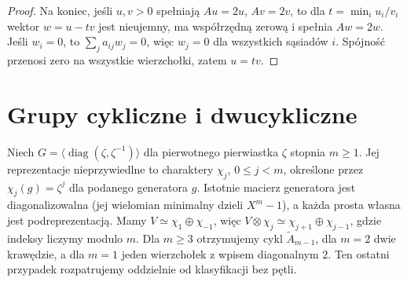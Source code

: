 \begin{proof}
Na koniec, jeśli $u,v>0$ spełniają $Au=2u$, $Av=2v$,
to dla $t=\min_i u_i/v_i$ wektor $w=u-tv$ jest
nieujemny, ma współrzędną zerową i spełnia $Aw=2w$.
Jeśli $w_i=0$, to $\sum_j a_{ij}w_j=0$, więc
$w_j=0$ dla wszystkich sąsiadów $i$. Spójność
przenosi zero na wszystkie wierzchołki, zatem $u=tv$.
\end{proof}

\section{Grupy cykliczne i dwucykliczne}

\begin{przyklad}
\label{aa:prz:mckay-cyclic}
Niech $G=\langle\operatorname{diag}(\zeta,\zeta^{-1})\rangle$
dla pierwotnego pierwiastka $\zeta$ stopnia $m\ge1$.
Jej reprezentacje nieprzywiedlne to charaktery $\chi_j$,
$0\le j<m$, określone przez $\chi_j(g)=\zeta^j$ dla
podanego generatora $g$. Istotnie macierz generatora
jest diagonalizowalna (jej wielomian minimalny dzieli
$X^m-1$), a każda prosta własna jest podreprezentacją.
Mamy $V\simeq\chi_1\oplus\chi_{-1}$, więc
$V\otimes\chi_j\simeq\chi_{j+1}\oplus\chi_{j-1}$,
gdzie indeksy liczymy modulo $m$.
Dla $m\ge3$ otrzymujemy cykl $\widetilde A_{m-1}$,
dla $m=2$ dwie krawędzie, a dla $m=1$ jeden wierzchołek
z wpisem diagonalnym $2$. Ten ostatni przypadek
rozpatrujemy oddzielnie od klasyfikacji bez pętli.
\end{przyklad}

